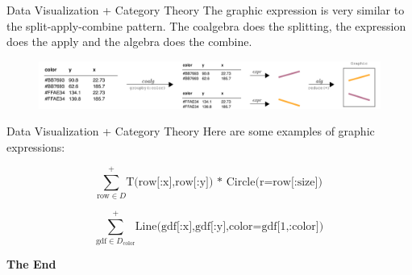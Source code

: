 \documentclass[aspectratio=169,xcolor=dvipsnames,10pt]{beamer}
\theoremstyle{definition}
\begin{document}
\begin{frame}[fragile]{Data Visualization + Category Theory}
  The graphic expression is very similar to the split-apply-combine
  pattern. The coalgebra does the splitting, the expression does the
  apply and the algebra does the combine.

  \begin{figure}
    \begin{center}
        \includegraphics[width=1.0\textwidth]{./figs/graphicexpression.pdf}
    \end{center}
  \end{figure}
\end{frame}


\begin{frame}[fragile]{Data Visualization + Category Theory}
  Here are some examples of graphic expressions:

  $$
  \sum^{+}_{\text{row} \in D} \text{T(row[:x],row[:y]) * Circle(r=row[:size])}
  $$

  \vspace{3mm}

  $$
  \sum^{+}_{\text{gdf} \in D_\text{color}} \text{Line(gdf[:x],gdf[:y],color=gdf[1,:color])}
  $$
\end{frame}

%     
%     


\begin{frame}
    \Huge{\centerline{\textbf{The End}}}
\end{frame}

\end{document}
